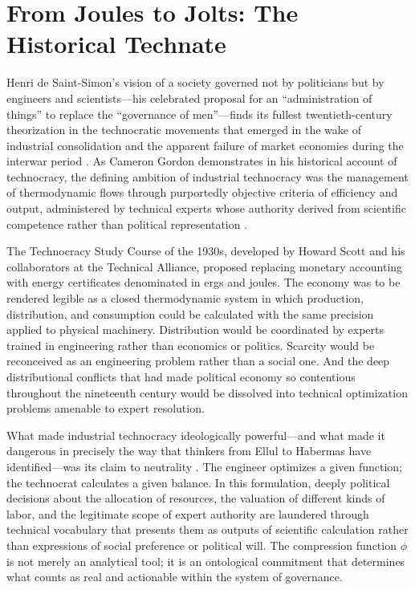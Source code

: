 \documentclass[12pt]{article}
\begin{document}
\section{From Joules to Jolts: The Historical Technate}

Henri de Saint-Simon's vision of a society governed not by politicians but by engineers and scientists---his celebrated proposal for an ``administration of things'' to replace the ``governance of men''---finds its fullest twentieth-century theorization in the technocratic movements that emerged in the wake of industrial consolidation and the apparent failure of market economies during the interwar period \citep{SaintSimon1964}. As Cameron Gordon demonstrates in his historical account of technocracy, the defining ambition of industrial technocracy was the management of thermodynamic flows through purportedly objective criteria of efficiency and output, administered by technical experts whose authority derived from scientific competence rather than political representation \citep{GordonTechnocracy2025}.

The Technocracy Study Course of the 1930s, developed by Howard Scott and his collaborators at the Technical Alliance, proposed replacing monetary accounting with energy certificates denominated in ergs and joules. The economy was to be rendered legible as a closed thermodynamic system in which production, distribution, and consumption could be calculated with the same precision applied to physical machinery. Distribution would be coordinated by experts trained in engineering rather than economics or politics. Scarcity would be reconceived as an engineering problem rather than a social one. And the deep distributional conflicts that had made political economy so contentious throughout the nineteenth century would be dissolved into technical optimization problems amenable to expert resolution.

What made industrial technocracy ideologically powerful---and what made it dangerous in precisely the way that thinkers from Ellul to Habermas have identified---was its claim to neutrality \citep{Ellul1964, Habermas1989}. The engineer optimizes a given function; the technocrat calculates a given balance. In this formulation, deeply political decisions about the allocation of resources, the valuation of different kinds of labor, and the legitimate scope of expert authority are laundered through technical vocabulary that presents them as outputs of scientific calculation rather than expressions of social preference or political will. The compression function $\phi$ is not merely an analytical tool; it is an ontological commitment that determines what counts as real and actionable within the system of governance.
\end{document}
